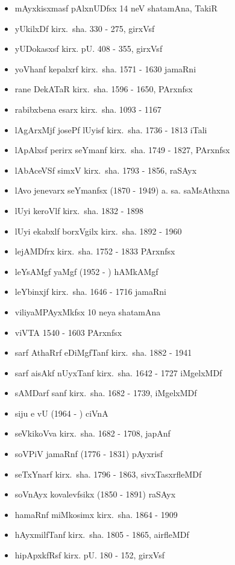{\begin{itemize}
\item mAyxkisxmasf pAlxnUDfsx {\rm 14} neV shatamAna, TakiR
\item yUkilxDf kirx.~sha. {\rm 330 - 275}, girxVsf
\item yUDokasxsf kirx. pU. {\rm 408 - 355}, girxVsf
\item yoVhanf kepalxrf kirx.~sha. {\rm 1571 - 1630} jamaRni
\item rane DekATaR kirx.~sha. {\rm 1596 - 1650}, PArxnfsx
\item rabibxbena esarx kirx.~sha. {\rm 1093 - 1167}
\item lAgArxMjf josePf lUyisf kirx.~sha. {\rm 1736 - 1813} iTali
\item lApAlxsf perirx seYmanf kirx.~sha. {\rm 1749 - 1827}, PArxnfsx
\item lAbAceVSf simxV kirx.~sha. {\rm 1793 - 1856}, raSAyx
\item lAvo jenevarx seYmanfsx {\rm (1870 - 1949)} a. sa. saMsAthxna
\item lUyi keroVlf kirx.~sha. {\rm 1832 - 1898}
\item lUyi ekabxlf borxVgilx kirx.~sha. {\rm 1892 - 1960}
\item lejAMDfrx kirx.~sha. {\rm 1752 - 1833} PArxnfsx
\item leYsAMgf yaMgf {\rm (1952 - )} hAMkAMgf 
\item leYbinxjf kirx.~sha. {\rm 1646 - 1716} jamaRni
\item viliyaMPAyxMkfsx {\rm 10} neya shatamAna
\item viVTA {\rm 1540 - 1603} PArxnfsx
\item sarf AthaRrf eDiMgfTanf kirx.~sha. {\rm 1882 - 1941}
\item sarf aisAkf nUyxTanf kirx.~sha. {\rm 1642 - 1727} iMgelxMDf
\item sAMDarf sanf kirx.~sha. {\rm 1682 - 1739}, iMgelxMDf
\item siju e vU {\rm (1964 - )} ciVnA
\item seVkikoVva kirx.~sha. {\rm 1682 - 1708}, japAnf
\item soVPiV jamaRnf {\rm (1776 - 1831)} pAyxrisf
\item seTxYnarf kirx.~sha. {\rm 1796 - 1863}, sivxTasxrfleMDf
\item soVnAyx kovalevfsikx {\rm (1850 - 1891)} raSAyx
\item hamaRnf miMkosimx kirx.~sha. {\rm 1864 - 1909}
\item hAyxmilfTanf kirx.~sha. {\rm 1805 - 1865}, airfleMDf
\item hipApxkfRsf kirx. pU. {\rm 180 - 152}, girxVsf

\end{itemize}}
